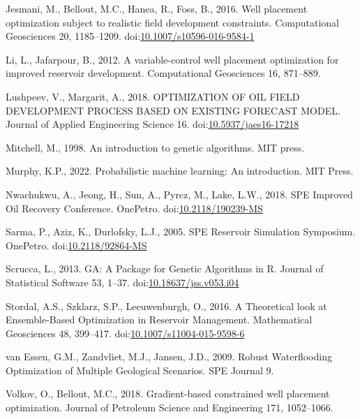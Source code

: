\documentclass[]{elsarticle} %
\newlength{\cslhangindent}
\newenvironment{CSLReferences}[2] %
 {%
  \setlength{\parindent}{0pt}
  \ifodd #1 \everypar{\setlength{\hangindent}{\cslhangindent}}\ignorespaces\fi
  \ifnum #2 > 0
  \setlength{\parskip}{#2\baselineskip}
  \fi
 }%
 {}
\begin{document}
\begin{CSLReferences}{1}{0}
\leavevmode{}%
Jesmani, M., Bellout, M.C., Hanea, R., Foss, B., 2016. Well placement optimization subject to realistic field development constraints. Computational Geosciences 20, 1185--1209. doi:\href{https://doi.org/10.1007/s10596-016-9584-1}{10.1007/s10596-016-9584-1}

\leavevmode{}%
Li, L., Jafarpour, B., 2012. A variable-control well placement optimization for improved reservoir development. Computational Geosciences 16, 871--889.

\leavevmode{}%
Lushpeev, V., Margarit, A., 2018. OPTIMIZATION OF OIL FIELD DEVELOPMENT PROCESS BASED ON EXISTING FORECAST MODEL. Journal of Applied Engineering Science 16. doi:\href{https://doi.org/10.5937/jaes16-17218}{10.5937/jaes16-17218}

\leavevmode{}%
Mitchell, M., 1998. An introduction to genetic algorithms. MIT press.

\leavevmode{}%
Murphy, K.P., 2022. Probabilistic machine learning: An introduction. MIT Press.

\leavevmode{}%
Nwachukwu, A., Jeong, H., Sun, A., Pyrcz, M., Lake, L.W., 2018. SPE Improved Oil Recovery Conference. OnePetro. doi:\href{https://doi.org/10.2118/190239-MS}{10.2118/190239-MS}

\leavevmode{}%
Sarma, P., Aziz, K., Durlofsky, L.J., 2005. SPE Reservoir Simulation Symposium. OnePetro. doi:\href{https://doi.org/10.2118/92864-MS}{10.2118/92864-MS}

\leavevmode{}%
Scrucca, L., 2013. GA: A Package for Genetic Algorithms in R. Journal of Statistical Software 53, 1--37. doi:\href{https://doi.org/10.18637/jss.v053.i04}{10.18637/jss.v053.i04}

\leavevmode{}%
Stordal, A.S., Szklarz, S.P., Leeuwenburgh, O., 2016. A Theoretical look at Ensemble-Based Optimization in Reservoir Management. Mathematical Geosciences 48, 399--417. doi:\href{https://doi.org/10.1007/s11004-015-9598-6}{10.1007/s11004-015-9598-6}

\leavevmode{}%
van Essen, G.M., Zandvliet, M.J., Jansen, J.D., 2009. Robust Waterflooding Optimization of Multiple Geological Scenarios. SPE Journal 9.

\leavevmode{}%
Volkov, O., Bellout, M.C., 2018. Gradient-based constrained well placement optimization. Journal of Petroleum Science and Engineering 171, 1052--1066.

\end{CSLReferences}
\end{document}

